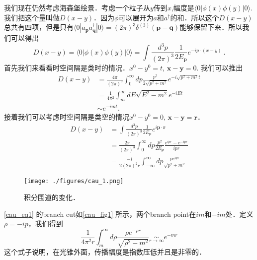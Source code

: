 
我们现在仍然考虑海森堡绘景．考虑一个粒子从$y$传到$x$,幅度是$\langle 0 |\phi(x)\phi(y)| 0 \rangle$.我们把这个量叫做$D(x-y)$．因为$\phi$可以展开为$a$和$a^\dagger$的和．所以这个$D(x-y)$总共有四项，但是只有$\langle 0 | a_{\mathbf p} a^\dagger_{\mathbf q} | 0 \rangle = (2\pi)^3 \delta^{(3)}(\mathbf p - \mathbf q)$能够保留下来．所以我们可以得出
\begin{equation}
D(x-y)=\langle 0|\phi(x) \phi(y)| 0\rangle=\int \frac{d^{3} p}{(2 \pi)^{3}} \frac{1}{2 E_{\mathbf{p}}} e^{-i p \cdot(x-y)}~.
\end{equation}
首先我们来看看时空间隔是类时的情况．$x^0 - y^0 = t$, $\mathbf x - \mathbf y = 0$. 我们可以推出
\begin{equation}
\begin{aligned}
D(x-y) &=\frac{4 \pi}{(2 \pi)^{3}} \int_{0}^{\infty} d p \frac{p^{2}}{2 \sqrt{p^{2}+m^{2}}} e^{-i \sqrt{p^{2}+m^{2}} t} \\
&=\frac{1}{4 \pi^{2}} \int_{m}^{\infty} d E \sqrt{E^{2}-m^{2}} e^{-i E t} \\
& \sim e^{-i m t} .
\end{aligned}
\end{equation}
接着我们可以考虑时空间隔是类空的情况$x^0 - y^0 = 0$, $\mathbf x - \mathbf y = \mathbf r$．
\begin{equation}\label{cau_eq1}
\begin{aligned}
D(x-y) &=\int \frac{d^{3} p}{(2 \pi)^{3}} \frac{1}{2 E_{\mathbf{p}}} e^{i \mathbf{p} \cdot \mathbf{r}} \\
&=\frac{2 \pi}{(2 \pi)^{3}} \int_{0}^{\infty} d p \frac{p^{2}}{2 E_{\mathbf{p}}} \frac{e^{i p r}-e^{-i p r}}{i p r} \\
&=\frac{-i}{2(2 \pi)^{2} r} \int_{-\infty}^{\infty} d p \frac{p e^{i p r}}{\sqrt{p^{2}+m^{2}}}
\end{aligned}
\end{equation}
\begin{figure}[ht]
\centering
\texttt{[image: ./figures/cau\_1.png]}
\caption{积分围道的变化．} \label{cau_fig1}
\end{figure}
\autoref{cau_eq1} 的branch cut如\autoref{cau_fig1} 所示，两个branch point在$im$和$-im$处．定义$\rho = -ip$，我们得到
\begin{equation}
\frac{1}{4 \pi^{2} r} \int_{m}^{\infty} d \rho \frac{\rho e^{-\rho r}}{\sqrt{\rho^{2}-m^{2}}} \underset{r \rightarrow \infty}{\sim} e^{-m r}
\end{equation}
这个式子说明，在光锥外面，传播幅度是指数压低并且是非零的．
